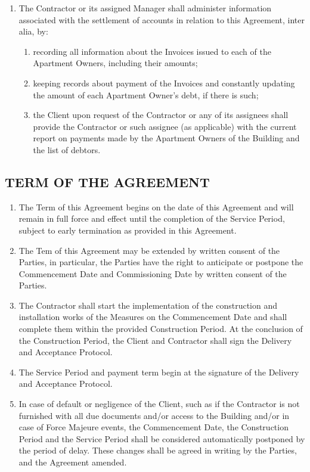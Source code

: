 \begin{multicols}{2}
\begin{enumerate}
	\item	The Contractor or its assigned Manager shall administer information associated with the settlement of accounts in relation to this Agreement, inter alia, by:
	\begin{enumerate}
		\item	recording all information about the Invoices issued to each of the Apartment Owners, including their amounts;
		\item	keeping records about payment of the Invoices and constantly updating the amount of each Apartment Owner’s debt, if there is such;
		\item	the Client upon request of the Contractor or any of its assignees shall provide the Contractor or such assignee (as applicable) with the current report on payments made by the Apartment Owners of the Building and the list of debtors.
	\end{enumerate}
\end{enumerate}

\subsection{TERM OF THE AGREEMENT}
\begin{enumerate}
	\item	The Term of this Agreement begins on the date of this Agreement and will remain in full force and effect until the completion of the Service Period, subject to early termination as provided in this Agreement.
	\item	The Tem of this Agreement may be extended by written consent of the Parties, in particular, the Parties have the right to anticipate or postpone the Commencement Date and Commissioning Date by written consent of the Parties.
	\item	The Contractor shall start the implementation of the construction and installation works of the Measures on the Commencement Date and shall complete them within the provided Construction Period. At the conclusion of the Construction Period, the Client and Contractor shall sign the Delivery and Acceptance Protocol.
	\item	The Service Period and payment term begin at the signature of the Delivery and Acceptance Protocol.
	\item	In case of default or negligence of the Client, such as if the Contractor is not furnished with all due documents and/or access to the Building and/or in case of Force Majeure events, the Commencement Date, the Construction Period and the Service Period shall be considered automatically postponed by the period of delay. These changes shall be agreed in writing by the Parties, and the Agreement amended.
\end{enumerate}


\end{multicols}
